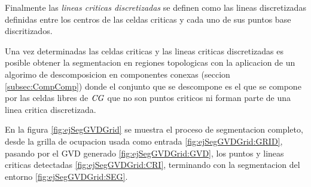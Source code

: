 






Finalmente las \emph{lineas criticas discretizadas} se definen como las lineas
discretizadas \cite{foleyphillips} definidas entre los centros de las celdas
criticas y cada uno de sus puntos base discritizados.

Una vez determinadas las celdas criticas y las lineas criticas discretizadas es
posible obtener la segmentacion en regiones topologicas con la aplicacion de un
algorimo de descomposicion en componentes conexas (seccion
\ref{subsec:CompComp}) donde el conjunto que se descompone es el que se compone
por las celdas libres de $\mathit{CG}$ que no son puntos criticos ni forman parte
de una linea critica discretizada.

En la figura \ref{fig:ejSegGVDGrid} se muestra el proceso de segmentacion
completo, desde la grilla de ocupacion usada como entrada
\ref{fig:ejSegGVDGrid:GRID}, pasando por el GVD generado
\ref{fig:ejSegGVDGrid:GVD}, los puntos y lineas criticas detectadas
\ref{fig:ejSegGVDGrid:CRI}, terminando con la segmentacion del entorno
\ref{fig:ejSegGVDGrid:SEG}.


